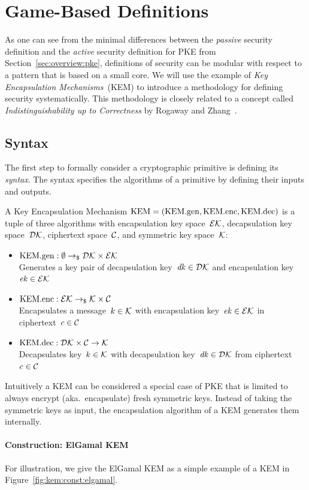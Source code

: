 \section{Game-Based Definitions}
As one can see from the minimal differences between the \emph{passive} security definition and the \emph{active} security definition for PKE from Section~\ref{sec:overview:pke}, definitions of security can be modular with respect to a pattern that is based on a small core.
We will use the example of \emph{Key Encapsulation Mechanisms}~(KEM) to introduce a methodology for defining security systematically.
This methodology is closely related to a concept called \emph{Indistinguishability up to Correctness} by Rogaway and Zhang~\cite{C:RogZha18}.

\subsection{Syntax}
The first step to formally consider a cryptographic primitive is defining its \emph{syntax}.
The syntax specifies the algorithms of a primitive by defining their inputs and outputs.

A Key Encapsulation Mechanism $\mathrm{KEM}=(\mathrm{KEM}.\mathrm{gen},\mathrm{KEM}.\mathrm{enc},\mathrm{KEM}.\mathrm{dec})$ is a tuple of three algorithms with encapsulation key space~$\mathcal{EK}$, decapsulation key space~$\mathcal{DK}$, ciphertext space~$\mathcal{C}$, and symmetric key space~$\mathcal{K}$:
\begin{itemize}
    \item $\mathrm{KEM}.\mathrm{gen}: \emptyset \to_\$ \mathcal{DK}\times\mathcal{EK}$\\ 
    Generates a key pair of decapsulation key~$\mathit{dk}\in\mathcal{DK}$ and encapsulation key~$\mathit{ek}\in\mathcal{EK}$
    \item $\mathrm{KEM}.\mathrm{enc}: \mathcal{EK} \to_\$ \mathcal{K}\times\mathcal{C}$\\
    Encapsulates a message~$k\in\mathcal{K}$ with encapsulation key~$\mathit{ek}\in\mathcal{EK}$ in ciphertext~$c\in\mathcal{C}$
    \item $\mathrm{KEM}.\mathrm{dec}: \mathcal{DK}\times\mathcal{C} \to \mathcal{K}$\\
    Decapsulates key~$k\in\mathcal{K}$ with decapsulation key~$\mathit{dk}\in\mathcal{DK}$ from ciphertext~$c\in\mathcal{C}$
\end{itemize}

Intuitively a KEM can be considered a special case of PKE that is limited to always encrypt (aka.\ encapsulate) fresh symmetric keys.
Instead of taking the symmetric keys as input, the encapsulation algorithm of a KEM generates them internally.

\paragraph{Construction: ElGamal KEM}
For illustration, we give the ElGamal KEM as a simple example of a KEM in Figure~\ref{fig:kem:const:elgamal}.

